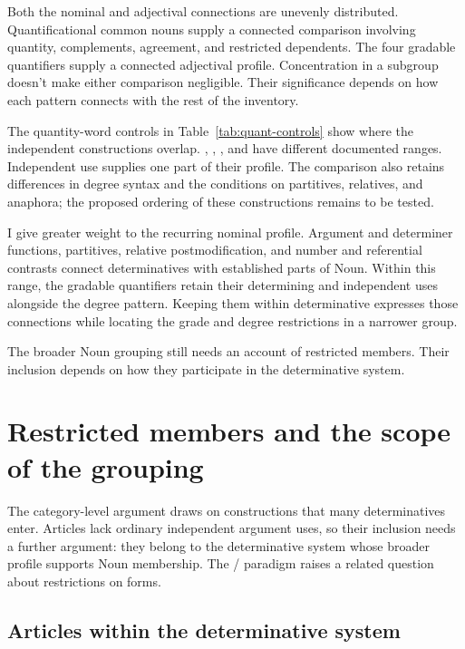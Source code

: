 \documentclass[12pt]{article}
\begin{document}
Both the nominal and adjectival connections are unevenly distributed. Quantificational common nouns supply a connected comparison involving quantity, complements, agreement, and restricted dependents. The four gradable quantifiers supply a connected adjectival profile. Concentration in a subgroup doesn't make either comparison negligible. Their significance depends on how each pattern connects with the rest of the inventory.

The quantity-word controls in Table~\ref{tab:quant-controls} show where the independent constructions overlap. , , , and  have different documented ranges. Independent use supplies one part of their profile. The comparison also retains differences in degree syntax and the conditions on partitives, relatives, and anaphora; the proposed ordering of these constructions remains to be tested.

I give greater weight to the recurring nominal profile. Argument and determiner functions, partitives, relative postmodification, and number and referential contrasts connect determinatives with established parts of Noun. Within this range, the gradable quantifiers retain their determining and independent uses alongside the degree pattern. Keeping them within determinative expresses those connections while locating the grade and degree restrictions in a narrower group.

The broader Noun grouping still needs an account of restricted members. Their inclusion depends on how they participate in the determinative system.

\section{Restricted members and the scope of the grouping}\label{sec:articles}

The category-level argument draws on constructions that many determinatives enter. Articles lack ordinary independent argument uses, so their inclusion needs a further argument: they belong to the determinative system whose broader profile supports Noun membership. The / paradigm raises a related question about restrictions on forms.

\subsection{Articles within the determinative system}\label{sec:article-membership}
\end{document}
